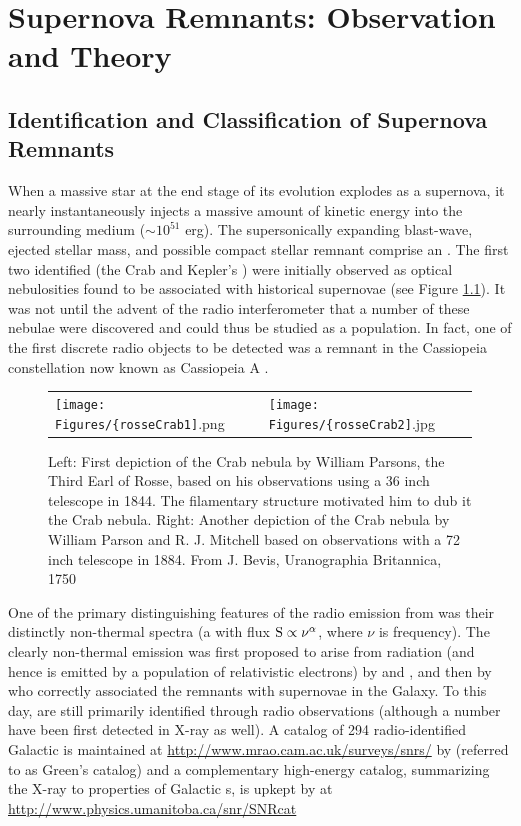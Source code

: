\chapter{Supernova Remnants: Observation and Theory}\label{chap:Rems}

\section{Identification and Classification of Supernova Remnants}\label{Rems:intro}
When a massive star at the end stage of its evolution explodes as a supernova, it nearly instantaneously injects a massive amount of kinetic energy into the surrounding medium ($\sim 10^{51}$ erg). The supersonically expanding blast-wave, ejected stellar mass, and possible compact stellar remnant comprise an \snr{}. The first two identified \snrs{} (the Crab and Kepler's \snr{}) were initially observed as optical nebulosities found to be associated with historical supernovae (see Figure \ref{fig:Crab}). It was not until the advent of the radio interferometer that a number of these nebulae were discovered and could thus be studied as a population.  In fact, one of the first discrete radio objects to be detected was a remnant in the Cassiopeia constellation now known as Cassiopeia A \citep{Ryle48}.

\begin{figure}[h!]
	\begin{center}
		\begin{tabular}{ll}
			\texttt{[image: Figures/\{rosseCrab1]}.png} &
			\texttt{[image: Figures/\{rosseCrab2]}.jpg} \\
		\end{tabular}
	\end{center}
	\caption[Historical Crab nebula drawings]{
		\label{fig:Crab}{Left: First depiction of the Crab nebula by William Parsons, the Third Earl of Rosse,  based on his observations using a 36 inch telescope in 1844. The filamentary structure motivated him to dub it the Crab nebula. Right: Another depiction of the Crab nebula  by William Parson and R. J. Mitchell based on observations with a 72 inch telescope in 1884. From J. Bevis, Uranographia Britannica, 1750}
	}
\end{figure}
One of the primary distinguishing features of the radio emission from \snrs{} was their distinctly non-thermal spectra (a \pl{} with flux  ${\rm S \propto \nu^\alpha}$, where $\nu$ is frequency). The clearly non-thermal emission was first proposed to arise from \sync{} radiation (and hence is emitted by a population of relativistic electrons) by \cite{Kiepenheuer50} and \cite{Alfven50}, and then by \cite{Shklovskii53} who correctly associated the remnants with supernovae in the Galaxy. To this day, \snrs{} are still primarily identified through radio observations (although a number have been first detected in X-ray as well). A catalog of 294 radio-identified Galactic \snrs{} is maintained at \url{http://www.mrao.cam.ac.uk/surveys/snrs/} by \cite{Green14} (referred to as Green's catalog) and a complementary high-energy catalog, summarizing the X-ray to \gam{} properties of Galactic \snr{}s, is upkept by \cite{Ferrand12} at \url{http://www.physics.umanitoba.ca/snr/SNRcat}

